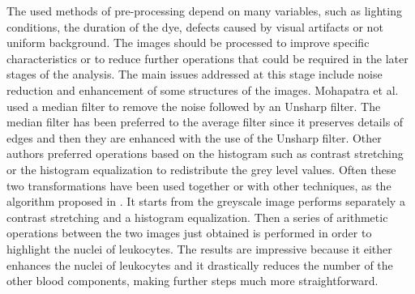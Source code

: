 The used methods of pre-processing depend on many variables, such as lighting conditions, the duration of the dye, defects caused by visual artifacts or not uniform background. The images should be processed to improve specific characteristics or to reduce further operations that could be required in the later stages of the analysis. The main issues addressed at this stage include noise reduction and enhancement of some structures of the images. Mohapatra et al. \cite{Mohapatra10a, Mohapatra10b, Mohapatra10c, Mohapatra14} used a median filter to remove the noise followed by an Unsharp filter. The median filter has been preferred to the average filter since it preserves details of edges and then they are enhanced with the use of the Unsharp filter. Other authors preferred operations based on the histogram such as contrast stretching or the histogram equalization to redistribute the grey level values. Often these two transformations have been used together or with other techniques, as the algorithm proposed in \cite{Madhloom}. It starts from the greyscale image performs separately a contrast stretching and a histogram equalization. Then a series of arithmetic operations between the two images just obtained is performed in order to highlight the nuclei of leukocytes. The results are impressive because it either enhances the nuclei of leukocytes and it drastically reduces the number of the other blood components, making further steps much more straightforward.

